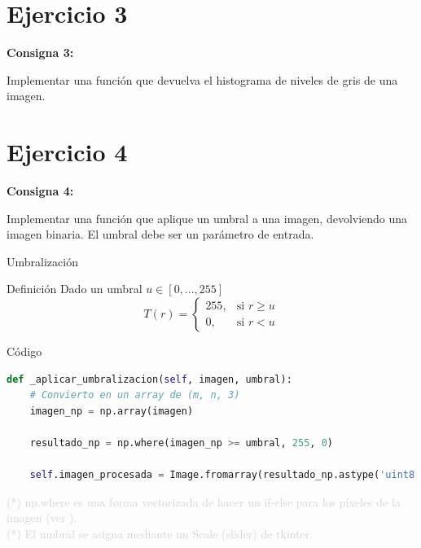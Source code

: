 \documentclass{beamer}
\begin{document}
\section{Ejercicio 3}

\begin{frame}
	\begin{center}
		\textcolor{unahurverde}{\textbf{Consigna 3:}}
	\end{center}
	\justifying
	
	Implementar una función que devuelva el histograma de niveles de gris de una imagen.
\end{frame}

\section{Ejercicio 4}

\begin{frame}
	\begin{center}
		\textcolor{unahurverde}{\textbf{Consigna 4:}}
	\end{center}
	\justifying
	
	Implementar una función que aplique un umbral a una imagen, devolviendo una imagen binaria. El umbral debe ser un parámetro de entrada.
\end{frame}

\begin{frame}[fragile]{Umbralización}
	\justifying
	
	\begin{block}{Definición}
		Dado un umbral $u \in [0,...,255]$
		\[
		T(r) =
		\begin{cases}
			255, & \text{si } r \geq u \\
			0, & \text{si } r < u
		\end{cases}
		\]
	\end{block}
\end{frame}

\begin{frame}[fragile]{Código}
	\justifying
	
	\begin{lstlisting}[language=Python]
def _aplicar_umbralizacion(self, imagen, umbral):
	# Convierto en un array de (m, n, 3)
	imagen_np = np.array(imagen)
	
	resultado_np = np.where(imagen_np >= umbral, 255, 0)
	
	self.imagen_procesada = Image.fromarray(resultado_np.astype('uint8'))
	\end{lstlisting}
	
	\vfill
	\footnotesize \textcolor{lightgray}{(*) np.where es una forma vectorizada de hacer un if-else para los píxeles de la imagen (ver \cite{numpy-where}).}\\
	\footnotesize \textcolor{lightgray}{(*) El umbral se asigna mediante un Scale (slider) de tkinter.}
\end{frame}
\end{document}
